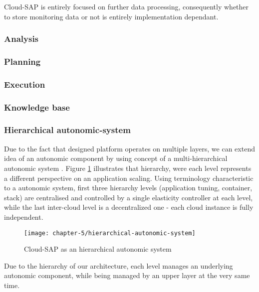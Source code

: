 Cloud-SAP is entirely focused on further data processing, consequently whether to store monitoring data or not is entirely implementation dependant.

\subsubsection{Analysis}


\subsubsection{Planning}

\subsubsection{Execution}

\subsubsection{Knowledge base}

\subsubsection{Hierarchical autonomic-system}
Due to the fact that designed platform operates on multiple layers, we can extend idea of an autonomic component by using concept of a multi-hierarchical autonomic system \cite{LiWoZh05}. Figure \ref{design:hierarchical-autonomic-system} illustrates that hierarchy, were each level represents a different perspective on an application scaling. Using terminology characteristic to a autonomic system, first three hierarchy levels (application tuning, container, stack) are centralised and controlled by a single elasticity controller at each level, while the last inter-cloud level is a decentralized one - each cloud instance is fully independent.

\begin{figure}[!ht]
  \begin{center}
    \texttt{[image: chapter-5/hierarchical-autonomic-system]}
  \end{center}
  \caption{Cloud-SAP as an hierarchical autonomic system}
  \label{design:hierarchical-autonomic-system}
\end{figure}

Due to the hierarchy of our architecture, each level manages an underlying autonomic component, while being managed by an upper layer at the very same time.



